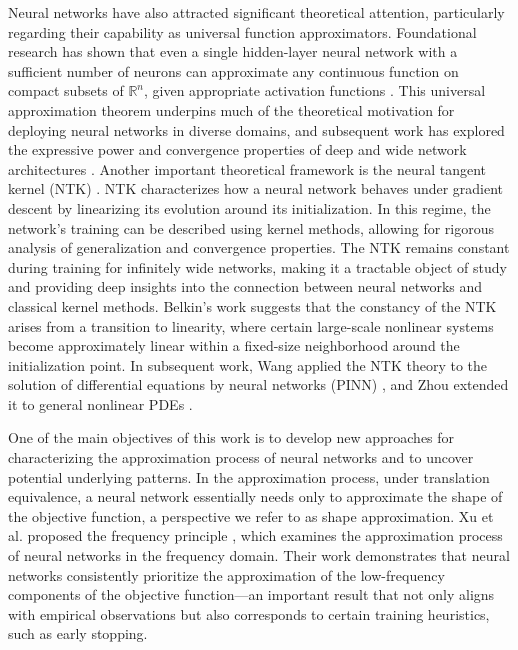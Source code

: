\documentclass[final]{siamart220329}
\newtheorem{theoretical insights}{Theoretical insights}
\newtheorem{practical takeaway}{Practical takeaway}
\begin{document}
Neural networks have also attracted significant theoretical attention, particularly regarding their capability as universal function approximators. Foundational research has shown that even a single hidden-layer neural network with a sufficient number of neurons can approximate any continuous function on compact subsets of $\mathbb{R}^n$, given appropriate activation functions \cite{cybenko1989approximation}. This universal approximation theorem underpins much of the theoretical motivation for deploying neural networks in diverse domains, and subsequent work has explored the expressive power and convergence properties of deep and wide network architectures \cite{leshno1993multilayer,telgarsky2016benefits,lu2017expressive,barron1993universal,yarotsky2017error}.
Another important theoretical framework is the neural tangent kernel (NTK) \cite{jacot2018neural}. NTK characterizes how a neural network behaves under gradient descent by linearizing its evolution around its initialization. In this regime, the network's training can be described using kernel methods, allowing for rigorous analysis of generalization and convergence properties. The NTK remains constant during training for infinitely wide networks, making it a tractable object of study and providing deep insights into the connection between neural networks and classical kernel methods.
Belkin's work \cite{liu2020linearity} suggests that the constancy of the NTK arises from a transition to linearity, where certain large-scale nonlinear systems become approximately linear within a fixed-size neighborhood around the initialization point.
In subsequent work, Wang applied the NTK theory to the solution of differential equations by neural networks (PINN) \cite{wang2022and}, and Zhou extended it to general nonlinear PDEs \cite{zhou2024neural}.



One of the main objectives of this work is to develop new approaches for characterizing the approximation process of neural networks and to uncover potential underlying patterns. In the approximation process, under translation equivalence, a neural network essentially needs only to approximate the shape of the objective function, a perspective we refer to as shape approximation. Xu et al. proposed the frequency principle \cite{xu2020frequency,xu2024overview}, which examines the approximation process of neural networks in the frequency domain. Their work demonstrates that neural networks consistently prioritize the approximation of the low-frequency components of the objective function—an important result that not only aligns with empirical observations but also corresponds to certain training heuristics, such as early stopping.
\end{document}
